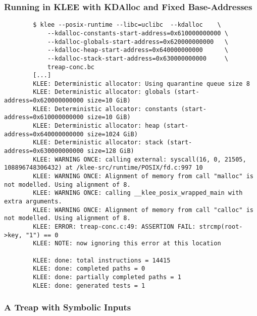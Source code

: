 \documentclass{beamer}
\begin{document}
\begin{frame}[fragile]
	\frametitle{Running in KLEE with KDAlloc and Fixed Base-Addresses}
	\begin{verbatim}
		$ klee --posix-runtime --libc=uclibc  --kdalloc    \
			--kdalloc-constants-start-address=0x610000000000 \
			--kdalloc-globals-start-address=0x620000000000   \
			--kdalloc-heap-start-address=0x640000000000      \
			--kdalloc-stack-start-address=0x630000000000     \
			treap-conc.bc
		[...]
		KLEE: Deterministic allocator: Using quarantine queue size 8
		KLEE: Deterministic allocator: globals (start-address=0x620000000000 size=10 GiB)
		KLEE: Deterministic allocator: constants (start-address=0x610000000000 size=10 GiB)
		KLEE: Deterministic allocator: heap (start-address=0x640000000000 size=1024 GiB)
		KLEE: Deterministic allocator: stack (start-address=0x630000000000 size=128 GiB)
		KLEE: WARNING ONCE: calling external: syscall(16, 0, 21505, 108896748306432) at /klee-src/runtime/POSIX/fd.c:997 10
		KLEE: WARNING ONCE: Alignment of memory from call "malloc" is not modelled. Using alignment of 8.
		KLEE: WARNING ONCE: calling __klee_posix_wrapped_main with extra arguments.
		KLEE: WARNING ONCE: Alignment of memory from call "calloc" is not modelled. Using alignment of 8.
		KLEE: ERROR: treap-conc.c:49: ASSERTION FAIL: strcmp(root->key, "1") == 0
		KLEE: NOTE: now ignoring this error at this location

		KLEE: done: total instructions = 14415
		KLEE: done: completed paths = 0
		KLEE: done: partially completed paths = 1
		KLEE: done: generated tests = 1
	\end{verbatim}
\end{frame}

\begin{frame}
	\frametitle{A Treap with Symbolic Inputs}
	\begin{columns}
		\begin{column}{0.5\textwidth}
			\inputminted[fontsize={\fontsize{6}{6}\selectfont},linenos=true,lastline=30]{c}{demo-repo/treap-sym.c}
		\end{column}
		\begin{column}{0.5\textwidth}
			\inputminted[fontsize={\fontsize{6}{6}\selectfont},linenos=true,firstline=31]{c}{demo-repo/treap-sym.c}
		\end{column}
	\end{columns}
\end{frame}
\end{document}
